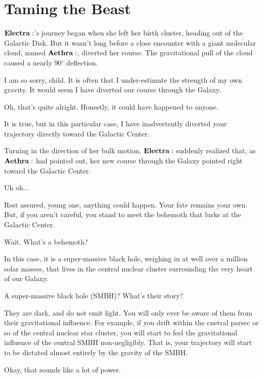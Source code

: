 \documentclass[main.tex]{subfiles}
\begin{document}
\section{Taming the Beast}


$\Electra$'s journey began when she left her birth cluster, heading out of the Galactic Disk.  But it wasn't long before a close encounter with a giant molecular cloud, named $\Aethra$, diverted her course.  The gravitational pull of the cloud caused a nearly 90$^{\circ}$ deflection.  

\Aethra I am so sorry, child.  It is often that I under-estimate the strength of my own gravity.  It would seem I have diverted our course through the Galaxy.

\Electra Oh, that's quite alright.  Honestly, it could have happened to anyone.

\Aethra It is true, but in this particular case, I have inadvertently diverted your trajectory directly toward the Galactic Center.

Turning in the direction of her bulk motion, $\Electra$ suddenly realized that, as $\Aethra$ had pointed out, her new course through the Galaxy pointed right toward the Galactic Center.  

\Electras Uh oh...

\Aethra Rest assured, young one, anything could happen.  Your fate remains your own.  But, if you aren't careful, you stand to meet the behemoth that lurks at the Galactic Center.

\Electra Wait.  What's a behemoth?

\Aethra In this case, it is a super-massive black hole, weighing in at well over a million solar masses, that lives in the central nuclear cluster surrounding the very heart of our Galaxy.  

\Electra A super-massive black hole (SMBH)?  What's their story?

\Aethra They are dark, and do not emit light.  You will only ever be aware of them from their gravitational influence.  For example, if you drift within the cnetral parsec or so of the central nuclear star cluster, you will start to feel the gravitational influence of the central SMBH non-negligibly.  That is, your trajectory will start to be dictated almost entirely by the gravity of the SMBH.  

\Electra Okay, that sounds like a lot of power.
\end{document}
